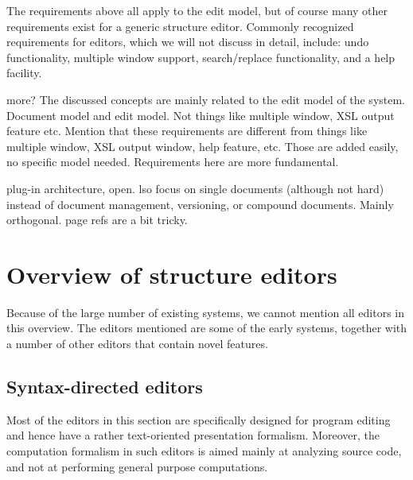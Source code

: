 The requirements above all apply to the edit model, but of course many other requirements exist for a generic structure editor.  Commonly recognized requirements for editors, which we will not discuss in detail, include: undo functionality, multiple window support, search/replace functionality, and a help facility. 

\bc
more?
The discussed concepts are mainly related to the edit model of the system. 
Document model and edit model. Not things like multiple window, XSL output feature etc.
Mention that these requirements are different from things like multiple window, XSL output window, help feature, etc. Those are added easily, no specific model needed. Requirements here are more fundamental.

plug-in architecture, open.
lso focus on single documents (although not hard) 
instead of document management, versioning, or compound documents. Mainly orthogonal.
page refs are a bit tricky.
\ec







%																
%																
%																
\section{Overview of structure editors} \label{sect:overview}

Because of the large number of existing systems, we cannot mention all editors in this overview. The editors mentioned are some of the early systems, together with a number of other editors that contain novel features.


%																
\subsection{Syntax-directed editors} \label{sect:synDirEditors}

Most of the editors in this section are specifically designed for program editing and hence have a rather text-oriented presentation formalism. Moreover, the computation formalism in such editors is aimed mainly at analyzing source code, and not at performing general purpose computations. 

